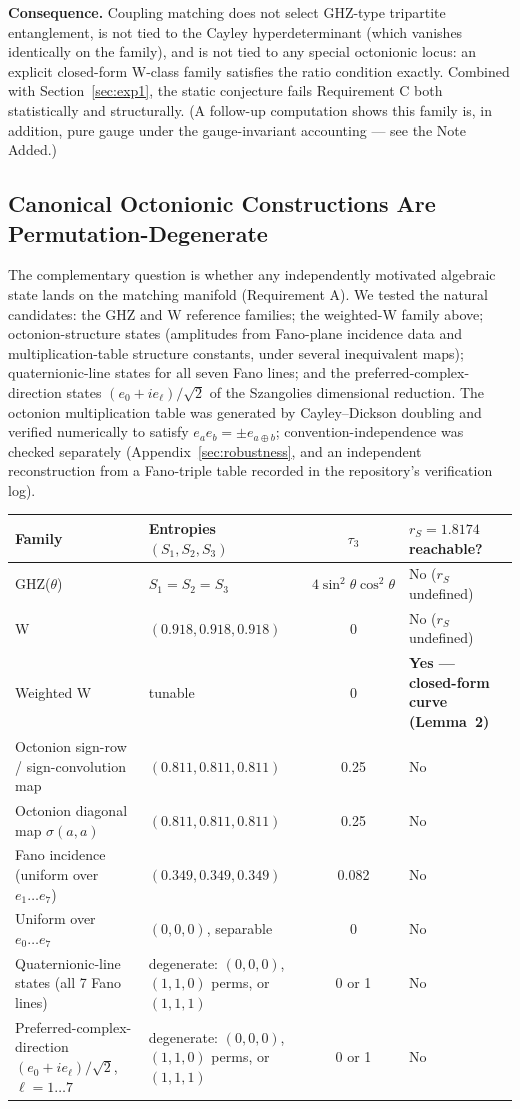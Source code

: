 \documentclass[11pt]{article}
\begin{document}
\textbf{Consequence.} Coupling matching does not select GHZ-type tripartite entanglement, is not tied to the Cayley hyperdeterminant (which vanishes identically on the family), and is not tied to any special octonionic locus: an explicit closed-form W-class family satisfies the ratio condition exactly. Combined with Section~\ref{sec:exp1}, the static conjecture fails Requirement C both statistically and structurally. (A follow-up computation shows this family is, in addition, pure gauge under the gauge-invariant accounting --- see the Note Added.)

\subsection{Canonical Octonionic Constructions Are Permutation-Degenerate}
\label{sec:octonionic}

The complementary question is whether any independently motivated algebraic state lands on the matching manifold (Requirement A). We tested the natural candidates: the GHZ and W reference families; the weighted-W family above; octonion-structure states (amplitudes from Fano-plane incidence data and multiplication-table structure constants, under several inequivalent maps); quaternionic-line states for all seven Fano lines; and the preferred-complex-direction states $(e_0 + i e_\ell)/\sqrt{2}$ of the Szangolies dimensional reduction. The octonion multiplication table was generated by Cayley--Dickson doubling and verified numerically to satisfy $e_a e_b = \pm e_{a \oplus b}$; convention-independence was checked separately (Appendix~\ref{sec:robustness}, and an independent reconstruction from a Fano-triple table recorded in the repository's verification log).

\begin{center}
\small
\begin{tabular}{p{4.5cm}p{4.3cm}cp{2.6cm}}
\hline
Family & Entropies $(S_1, S_2, S_3)$ & $\tau_3$ & $r_S = 1.8174$ reachable? \\
\hline
GHZ($\theta$) & $S_1 = S_2 = S_3$ & $4\sin^2\theta\cos^2\theta$ & No ($r_S$ undefined) \\
W & $(0.918, 0.918, 0.918)$ & 0 & No ($r_S$ undefined) \\
Weighted W & tunable & 0 & \textbf{Yes --- closed-form curve (Lemma~2)} \\
Octonion sign-row / sign-convolution map & $(0.811, 0.811, 0.811)$ & 0.25 & No \\
Octonion diagonal map $\sigma(a,a)$ & $(0.811, 0.811, 0.811)$ & 0.25 & No \\
Fano incidence (uniform over $e_1 \ldots e_7$) & $(0.349, 0.349, 0.349)$ & 0.082 & No \\
Uniform over $e_0 \ldots e_7$ & $(0, 0, 0)$, separable & 0 & No \\
Quaternionic-line states (all 7 Fano lines) & degenerate: $(0,0,0)$, $(1,1,0)$ perms, or $(1,1,1)$ & 0 or 1 & No \\
Preferred-complex-direction $(e_0 + i e_\ell)/\sqrt{2}$, $\ell = 1 \ldots 7$ & degenerate: $(0,0,0)$, $(1,1,0)$ perms, or $(1,1,1)$ & 0 or 1 & No \\
\hline
\end{tabular}
\end{center}
\end{document}
